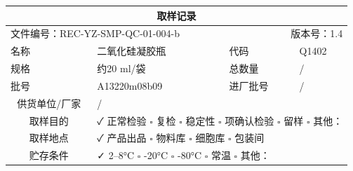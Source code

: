 \documentclass[UTF8,10pt,a4paper,fontset=fandol]{ctexart}
\newcommand{\fieldvalue}[1]{#1}
\newcommand{\handwritten}[1]{#1}
\begin{document}
\begin{center}
\small
\begin{tabularx}{0.92\textwidth}{|p{2.2cm}|X|p{2.2cm}|X|}
\hline
\multicolumn{4}{|c|}{\textbf{取样记录}}\\
\hline
\multicolumn{2}{|l|}{文件编号：REC-YZ-SMP-QC-01-004-b} &
\multicolumn{2}{r|}{版本号：1.4}\\
\hline
名称 &
\fieldvalue{\handwritten{二氧化硅凝胶瓶}} &
代码 &
\fieldvalue{\handwritten{Q1402}}\\
\hline
规格 &
\fieldvalue{\handwritten{约20 ml/袋}} &
总数量 &
\fieldvalue{\handwritten{/}}\\
\hline
批号 &
\fieldvalue{\handwritten{A13220m08b09}} &
进厂批号 &
\fieldvalue{\handwritten{/}}\\
\hline
\multicolumn{1}{|c|}{供货单位/厂家} &
\multicolumn{3}{l|}{
\fieldvalue{\handwritten{/}}}\\
\hline
\multicolumn{1}{|c|}{取样目的} &
\multicolumn{3}{l|}{
\fieldvalue{\handwritten{✓ 正常检验}}
\quad $\square$ 复检
\quad $\square$ 稳定性
\quad $\square$ 项确认检验
\quad $\square$ 留样
\quad $\square$ 其他：\underline{\hspace{2cm}}}\\
\hline
\multicolumn{1}{|c|}{取样地点} &
\multicolumn{3}{l|}{
\fieldvalue{\handwritten{✓ 产品出品}}
\quad $\square$ 物料库
\quad $\square$ 细胞库
\quad $\square$ 包装间}\\
\hline
\multicolumn{1}{|c|}{贮存条件} &
\multicolumn{3}{l|}{
\fieldvalue{\handwritten{✓ 2--8°C}}
\quad $\square$ -20°C
\quad $\square$ -80°C
\quad $\square$ 常温
\quad $\square$ 其他：\underline{\hspace{1.2cm}}}\\

\end{tabularx}
\end{center}
\end{document}
